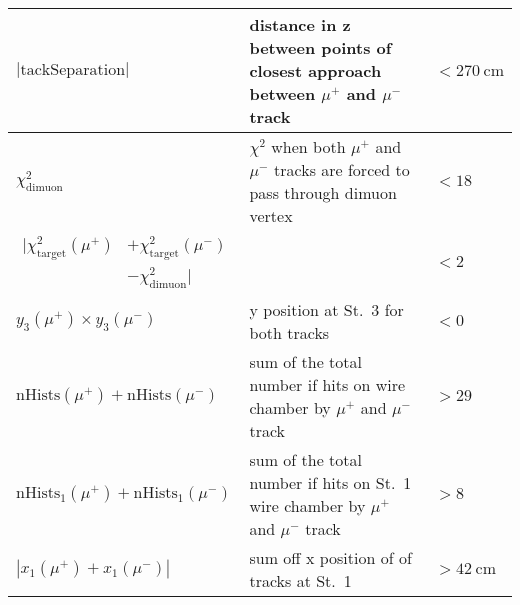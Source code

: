\documentclass[../main.tex]{subfiles}
\begin{document}
\begin{table}[ht!]
\begin{tabular}{|m{4.5cm}|m{7cm}|m{3cm}|}
		$|\mathrm{tackSeparation}|$                                                                         & distance in z between points   of  closest approach between $\mu^+$   and $\mu^-$ track  & $<\SI{270}{\cm}$               \\ \hline
		$\chi^2_{\mathrm{dimuon}}$                                                                                   & $\chi^2$ when both $\mu^+$ and   $\mu^-$ tracks are forced to pass through dimuon vertex & $<18$                          \\ \hline
		$\begin{aligned} |\chi^2_{\mathrm{target}}(\mu^+) &+ \chi^2_{\mathrm{target}}(\mu^-)\\& -\chi^2_{\mathrm{dimuon}}| \end{aligned}$ &                                                                                          & $<2$                           \\ \hline
		$y_3(\mu^+) \times y_3(\mu^-)$                                                                      & y position at St.~3 for both tracks                                                      & $<0$                           \\ \hline
		$\mathrm{nHists}(\mu^+)+\mathrm{nHists}(\mu^-)$                                                     & sum of the total number if hits on wire chamber by $\mu^+$ and $\mu^-$ track             & $>29$                          \\ \hline
		$\mathrm{nHists}_1(\mu^+)+\mathrm{nHists}_1(\mu^-)$                                                 & sum of the total number if hits on St.~1 wire chamber by $\mu^+$ and $\mu^-$ track       & $>8$                           \\ \hline
		$|x_1(\mu^+) + x_1(\mu^-)|$                                                                         & sum off x position of of tracks   at St.~1                                               & $>\SI{42}{\cm}$                \\ \hline
	\end{tabular}
\end{table}
\end{document}
